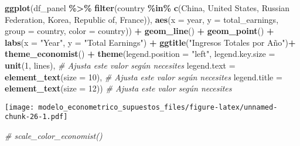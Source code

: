\documentclass[
]{article}
\newenvironment{Shaded}{\begin{snugshade}}{\end{snugshade}}
\newcommand{\AttributeTok}[1]{\textcolor[rgb]{0.13,0.29,0.53}{#1}}
\newcommand{\CommentTok}[1]{\textcolor[rgb]{0.56,0.35,0.01}{\textit{#1}}}
\newcommand{\DecValTok}[1]{\textcolor[rgb]{0.00,0.00,0.81}{#1}}
\newcommand{\FunctionTok}[1]{\textcolor[rgb]{0.13,0.29,0.53}{\textbf{#1}}}
\newcommand{\NormalTok}[1]{#1}
\newcommand{\SpecialCharTok}[1]{\textcolor[rgb]{0.81,0.36,0.00}{\textbf{#1}}}
\newcommand{\StringTok}[1]{\textcolor[rgb]{0.31,0.60,0.02}{#1}}
\begin{document}
\begin{Shaded}
\begin{Highlighting}[]
\FunctionTok{ggplot}\NormalTok{(df\_panel }\SpecialCharTok{\%\textgreater{}\%}
  \FunctionTok{filter}\NormalTok{(country }\SpecialCharTok{\%in\%} \FunctionTok{c}\NormalTok{(}\StringTok{\textquotesingle{}China\textquotesingle{}}\NormalTok{, }\StringTok{\textquotesingle{}United States\textquotesingle{}}\NormalTok{, }\StringTok{\textquotesingle{}Russian Federation\textquotesingle{}}\NormalTok{,}
                        \StringTok{\textquotesingle{}Korea, Republic of\textquotesingle{}}\NormalTok{, }\StringTok{\textquotesingle{}France\textquotesingle{}}\NormalTok{)),}
  \FunctionTok{aes}\NormalTok{(}\AttributeTok{x =}\NormalTok{ year, }\AttributeTok{y =}\NormalTok{ total\_earnings, }\AttributeTok{group =}\NormalTok{ country, }\AttributeTok{color =}\NormalTok{ country)) }\SpecialCharTok{+}
  \FunctionTok{geom\_line}\NormalTok{() }\SpecialCharTok{+}
  \FunctionTok{geom\_point}\NormalTok{() }\SpecialCharTok{+}
  \FunctionTok{labs}\NormalTok{(}\AttributeTok{x =} \StringTok{"Year"}\NormalTok{, }\AttributeTok{y =} \StringTok{"Total Earnings"}\NormalTok{) }\SpecialCharTok{+}
  \FunctionTok{ggtitle}\NormalTok{(}\StringTok{"Ingresos Totales por Año"}\NormalTok{)}\SpecialCharTok{+}
  \FunctionTok{theme\_economist}\NormalTok{() }\SpecialCharTok{+}
  \FunctionTok{theme}\NormalTok{(}\AttributeTok{legend.position =} \StringTok{"left"}\NormalTok{, }
        \AttributeTok{legend.key.size =} \FunctionTok{unit}\NormalTok{(}\DecValTok{1}\NormalTok{, }\StringTok{\textquotesingle{}lines\textquotesingle{}}\NormalTok{), }\CommentTok{\# Ajusta este valor según necesites}
        \AttributeTok{legend.text =} \FunctionTok{element\_text}\NormalTok{(}\AttributeTok{size =} \DecValTok{10}\NormalTok{), }\CommentTok{\# Ajusta este valor según necesites}
        \AttributeTok{legend.title =} \FunctionTok{element\_text}\NormalTok{(}\AttributeTok{size =} \DecValTok{12}\NormalTok{)) }\CommentTok{\# Ajusta este valor según necesites}
\end{Highlighting}
\end{Shaded}

\texttt{[image: modelo\_econometrico\_supuestos\_files/figure-latex/unnamed-chunk-26-1.pdf]}

\begin{Shaded}
\begin{Highlighting}[]
  \CommentTok{\# scale\_color\_economist()}
\end{Highlighting}
\end{Shaded}
\end{document}

